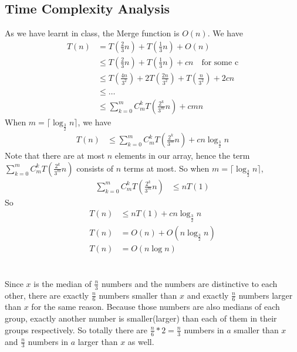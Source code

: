 \documentclass[12pt,letterpaper]{article}
\begin{document}
\subsection{Time Complexity Analysis}
As we have learnt in class, the Merge function is $O(n)$. We have
\begin{align}
    T(n)&=T(\frac{2}{3}n)+T(\frac{1}{3}n)+O(n)\\
    &\leq T(\frac{2}{3}n)+T(\frac{1}{3}n)+cn\quad \text{for some c}\\
    &\leq T(\frac{4n}{3^2})+2T(\frac{2n}{3^2})+T(\frac{n}{3^2})+2cn\\
    &\leq\dots\\
    &\leq \sum_{k=0}^m C_{m}^{k}T(\frac{2^k}{3^m}n)+cmn
\end{align}
When $m=\lceil\log_{\frac{3}{2}}n\rceil$, we have 
\begin{align}
    T(n)&\leq \sum_{k=0}^m C_{m}^{k}T(\frac{2^k}{3^m}n)+cn\log_{\frac{3}{2}}n
\end{align} 
Note that there are at most $n$ elements in our array, hence the term $\sum_{k=0}^m C_{m}^{k}T(\frac{2^k}{3^m}n)$ consists of $n$ terms at most. So when $m=\lceil\log_{\frac{3}{2}}n\rceil$,
\begin{align}
    \sum_{k=0}^m C_{m}^{k}T(\frac{2^k}{3^m}n)&\leq nT(1)
\end{align}  
So
\begin{align}
    T(n)&\leq nT(1)+cn\log_{\frac{3}{2}}n \\
    T(n)&=O(n)+O(n\log_{\frac{3}{2}}n)\\
    T(n)&=O(n\log n)
\end{align}

\section{}

\section{}
\subsection{}
Since $x$ is the median of $\frac{n}{3}$ numbers and the numbers are distinctive to each other, there are exactly $\frac{n}{6}$ numbers smaller than $x$ and exactly $\frac{n}{6}$ numbers larger than $x$ for the same reason. Because those numbers are also medians of each group, exactly another number is smaller(larger) than each of them in their groups respectively. So totally there are $\frac{n}{6}*2=\frac{n}{3}$ numbers in $a$ smaller than $x$ and $\frac{n}{3}$ numbers in $a$ larger than $x$ as well. 
\end{document}
